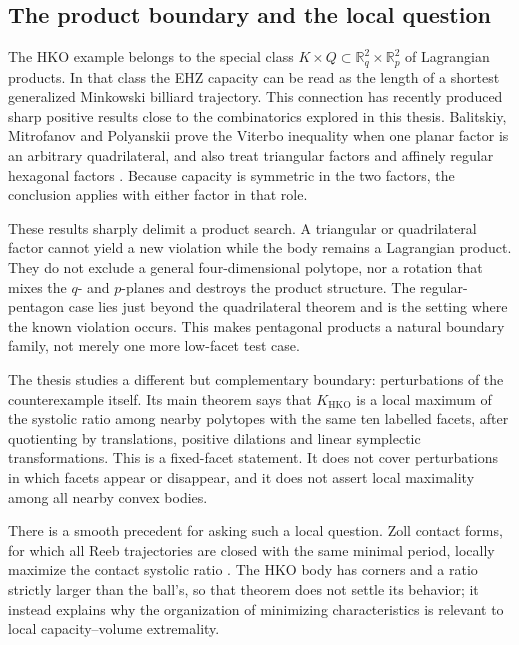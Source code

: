 \subsection{The product boundary and the local question}

The HKO example belongs to the special class
\(K\times Q\subset\mathbb R_q^2\times\mathbb R_p^2\) of Lagrangian products.
In that class the EHZ capacity can be read as the length of a shortest
generalized Minkowski billiard trajectory.  This connection has recently
produced sharp positive results close to the combinatorics explored in this
thesis.  Balitskiy, Mitrofanov and Polyanskii prove the Viterbo inequality
when one planar factor is an arbitrary quadrilateral, and also treat
triangular factors and affinely regular hexagonal factors
\cite[Theorem~1.2 and Sections~4--5]{BalitskiyMitrofanovPolyanskii2026}.
Because capacity is symmetric in the two factors, the conclusion applies
with either factor in that role.

These results sharply delimit a product search.  A triangular or
quadrilateral factor cannot yield a new violation while the body remains a
Lagrangian product.  They do not exclude a general four-dimensional
polytope, nor a rotation that mixes the \(q\)- and \(p\)-planes and destroys
the product structure.  The regular-pentagon case lies just beyond the
quadrilateral theorem and is the setting where the known violation occurs.
This makes pentagonal products a natural boundary family, not merely one
more low-facet test case.

The thesis studies a different but complementary boundary: perturbations of
the counterexample itself.  Its main theorem says that
\(K_{\mathrm{HKO}}\) is a local maximum of the systolic ratio among nearby
polytopes with the same ten labelled facets, after quotienting by
translations, positive dilations and linear symplectic transformations.
This is a fixed-facet statement.  It does not cover perturbations in which
facets appear or disappear, and it does not assert local maximality among all
nearby convex bodies.

There is a smooth precedent for asking such a local question.  Zoll contact
forms, for which all Reeb trajectories are closed with the same minimal
period, locally maximize the contact systolic ratio
\cite[Theorem~1]{AbbondandoloBenedetti2023}.  The HKO body has corners and a
ratio strictly larger than the ball's, so that theorem does not settle its
behavior; it instead explains why the organization of minimizing
characteristics is relevant to local capacity--volume extremality.

